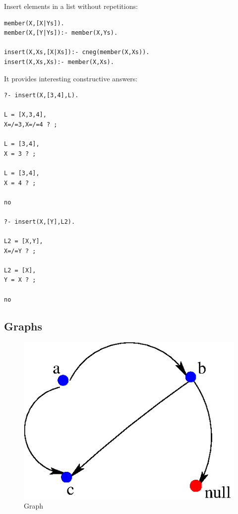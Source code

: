 \documentclass{tlp}
\begin{document}
Insert elements in a list without repetitions:
\begin{small}
\begin{verbatim}
member(X,[X|Ys]).
member(X,[Y|Ys]):- member(X,Ys).

insert(X,Xs,[X|Xs]):- cneg(member(X,Xs)).
insert(X,Xs,Xs):- member(X,Xs).
\end{verbatim}
\end{small}
It provides interesting constructive answers:
\begin{small}
\begin{verbatim}
?- insert(X,[3,4],L).

L = [X,3,4],
X=/=3,X=/=4 ? ;

L = [3,4],
X = 3 ? ;

L = [3,4],
X = 4 ? ;

no

?- insert(X,[Y],L2).

L2 = [X,Y],
X=/=Y ? ;

L2 = [X],
Y = X ? ;

no
\end{verbatim}
\end{small}

\subsection*{Graphs}

\begin{figure}
        \begin{center}
                \includegraphics[totalheight=4.3 cm]{graph.eps}
        \end{center}
        \caption{Graph}
        \label{fig:graph}
\end{figure}
\end{document}
